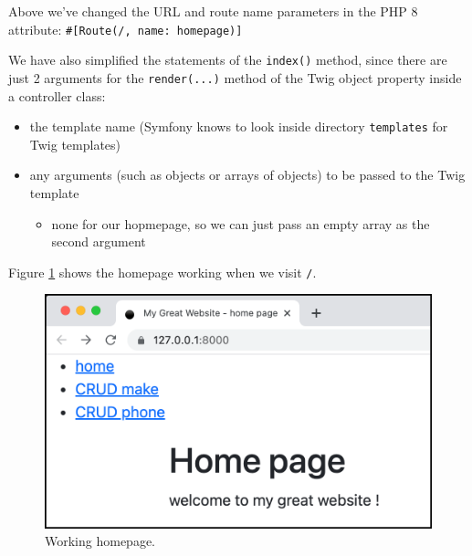 \documentclass[a4paperpaper,openright]{book}
\newenvironment{Shaded}{}{}
\newcommand{\CommentTok}[1]{\textcolor[rgb]{0.38,0.63,0.69}{\textit{#1}}}
\newcommand{\KeywordTok}[1]{\textcolor[rgb]{0.00,0.44,0.13}{\textbf{#1}}}
\newcommand{\NormalTok}[1]{#1}
\newcommand{\OtherTok}[1]{\textcolor[rgb]{0.00,0.44,0.13}{#1}}
\newcommand{\StringTok}[1]{\textcolor[rgb]{0.25,0.44,0.63}{#1}}
\providecommand{\tightlist}{%
  \setlength{\itemsep}{0pt}\setlength{\parskip}{0pt}}
\begin{document}
\begin{Shaded}
\end{Shaded}

Above we've changed the URL and route name parameters in the PHP 8
attribute:
\texttt{\#{[}Route(\textquotesingle{}/\textquotesingle{},\ name:\ \textquotesingle{}homepage\textquotesingle{}){]}}

We have also simplified the statements of the \texttt{index()} method,
since there are just 2 arguments for the \texttt{render(...)} method of
the Twig object property inside a controller class:

\begin{itemize}
\item
  the template name (Symfony knows to look inside directory
  \texttt{templates} for Twig templates)
\item
  any arguments (such as objects or arrays of objects) to be passed to
  the Twig template

  \begin{itemize}
  \tightlist
  \item
    none for our hopmepage, so we can just pass an empty array as the
    second argument
  \end{itemize}
\end{itemize}

Figure \ref{homepage_screenshot} shows the homepage working when we
visit \texttt{/}.

\begin{figure}
\centering
\includegraphics[width=1\textwidth,height=\textheight]{./tex2pdf.-b567767c1af560fd/3e33bd66d4293d128ccf182d28e9d7a2e65f421a.png}
\caption{Working homepage.\label{homepage_screenshot}}
\end{figure}
\end{document}
